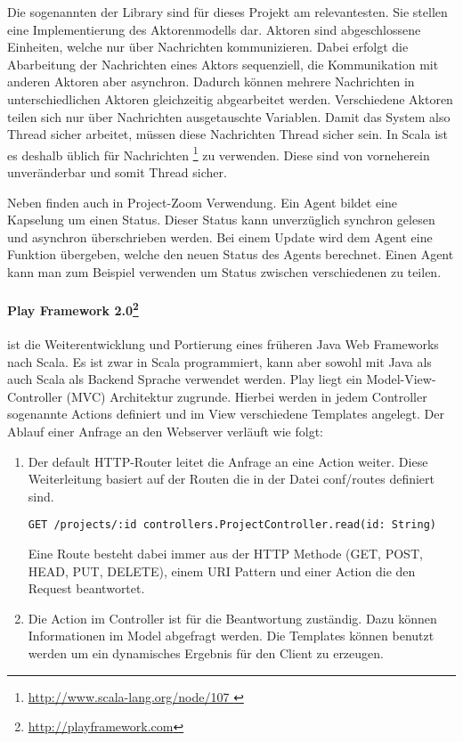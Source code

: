 Die sogenannten  der Library sind für dieses Projekt am relevantesten. Sie stellen eine Implementierung des Aktorenmodells dar. Aktoren sind abgeschlossene Einheiten, welche nur über Nachrichten kommunizieren. Dabei erfolgt die Abarbeitung der Nachrichten eines Aktors sequenziell, die Kommunikation mit anderen Aktoren aber asynchron. Dadurch können mehrere Nachrichten in unterschiedlichen Aktoren gleichzeitig abgearbeitet werden. Verschiedene Aktoren teilen sich nur über Nachrichten ausgetauschte Variablen. Damit das System also Thread sicher arbeitet, müssen diese Nachrichten Thread sicher sein. In Scala ist es deshalb üblich für Nachrichten \footnote{\url{ http://www.scala-lang.org/node/107 }} zu verwenden. Diese sind von vorneherein unveränderbar und somit Thread sicher.

Neben  finden auch  in Project-Zoom Verwendung. Ein Agent bildet eine Kapselung um einen Status. Dieser Status kann unverzüglich synchron gelesen und asynchron überschrieben werden. Bei einem Update wird dem Agent eine Funktion übergeben, welche den neuen Status des Agents berechnet. Einen Agent kann man zum Beispiel verwenden um Status zwischen verschiedenen  zu teilen.

\paragraph{Play Framework 2.0\footnote{\url{http://playframework.com}}} ist die Weiterentwicklung  und Portierung eines früheren Java Web Frameworks nach Scala. Es ist zwar in Scala programmiert, kann aber sowohl mit Java als auch Scala als Backend Sprache verwendet werden. Play liegt ein Model-View-Controller (MVC) Architektur zugrunde. Hierbei werden in jedem Controller sogenannte Actions definiert und im View verschiedene Templates angelegt. Der Ablauf einer Anfrage an den Webserver verläuft wie folgt:

\begin{enumerate}
  \item Der default HTTP-Router leitet die Anfrage an eine Action weiter. Diese Weiterleitung basiert auf der Routen die in der Datei conf/routes definiert  sind.
    \begin{lstlisting}
GET /projects/:id controllers.ProjectController.read(id: String)
    \end{lstlisting}
  Eine Route besteht dabei immer aus der HTTP Methode (GET, POST, HEAD, PUT, DELETE)\cite{play-scala-routing}, einem URI Pattern und einer Action die den Request beantwortet.
  \item Die Action im Controller ist für die Beantwortung zuständig. Dazu können Informationen im Model abgefragt werden. Die Templates können benutzt werden um ein dynamisches Ergebnis für den Client zu erzeugen.
\end{enumerate}

